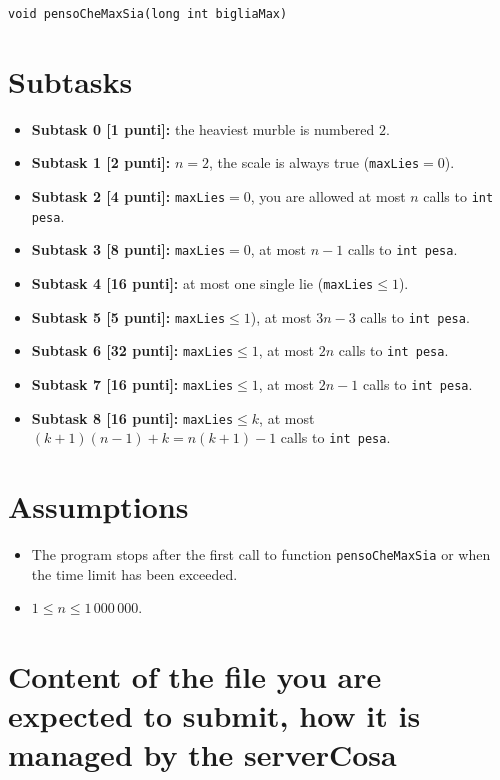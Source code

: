 \documentclass[a4paper,11pt]{article}
\begin{document}
  \vspace{0.2cm}
  
  \noindent
  \texttt{void pensoCheMaxSia(long int bigliaMax)}
  
  
  \section*{Subtasks}
  \begin{itemize}
    \item \textbf{Subtask 0 [1 punti]:} the heaviest murble is numbered $2$.
    \item \textbf{Subtask 1 [2 punti]:} $n=2$, the scale is always true (\texttt{maxLies}$= 0$).
    \item \textbf{Subtask 2 [4 punti]:} \texttt{maxLies}$= 0$, you are allowed at most $n$ calls to \texttt{int pesa}.
    \item \textbf{Subtask 3 [8 punti]:} \texttt{maxLies}$= 0$, at most $n-1$ calls to \texttt{int pesa}.
    \item \textbf{Subtask 4 [16 punti]:} at most one single lie (\texttt{maxLies}$\leq 1$).
    \item \textbf{Subtask 5 [5 punti]:} \texttt{maxLies}$\leq 1$), at most $3n-3$ calls to \texttt{int pesa}.
    \item \textbf{Subtask 6 [32 punti]:} \texttt{maxLies}$\leq 1$, at most $2n$ calls to \texttt{int pesa}.
    \item \textbf{Subtask 7 [16 punti]:} \texttt{maxLies}$\leq 1$, at most $2n-1$ calls to \texttt{int pesa}.
    \item \textbf{Subtask 8 [16 punti]:} \texttt{maxLies}$\leq k$, at most $(k+1)(n-1) +k = n(k+1)-1$ calls to \texttt{int pesa}.
  \end{itemize}
  
  \section*{Assumptions}
  \begin{itemize}[nolistsep, noitemsep]
    \item The program stops after the first call to function \texttt{pensoCheMaxSia} or when the time limit has been exceeded.
    \item $1 \le n \le 1\,000\,000$.
  \end{itemize}


  \section*{Content of the file you are expected to submit, how it is managed by the serverCosa}
\end{document}
